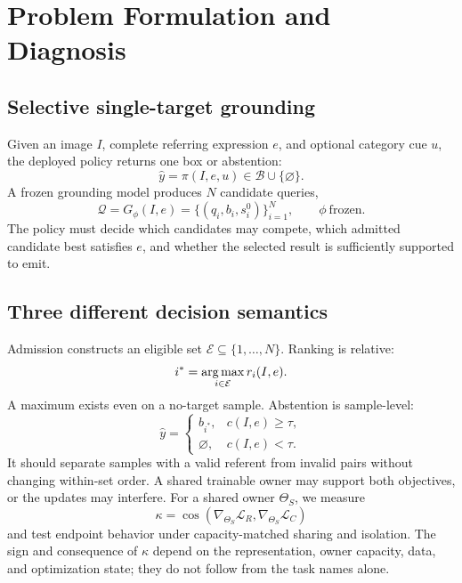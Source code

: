 \section{Problem Formulation and Diagnosis}
\label{sec:problem}

\subsection{Selective single-target grounding}
Given an image $I$, complete referring expression $e$, and optional category
cue $u$, the deployed policy returns one box or abstention:
\begin{equation}
  \hat y=\pi(I,e,u)\in\mathcal{B}\cup\{\varnothing\}.
\end{equation}
A frozen grounding model produces $N$ candidate queries,
\begin{equation}
  \mathcal{Q}=G_{\phi}(I,e)
  =\{(q_i,b_i,s_i^0)\}_{i=1}^{N},\qquad \phi\ \text{frozen}.
\end{equation}
The policy must decide which candidates may compete, which admitted candidate
best satisfies $e$, and whether the selected result is sufficiently supported
to emit.

\subsection{Three different decision semantics}
Admission constructs an eligible set $\mathcal{E}\subseteq\{1,\ldots,N\}$.
Ranking is relative:
\begin{equation}
  i^*=\operatorname*{arg\,max}_{i\in\mathcal{E}} r_i(I,e).
\end{equation}
A maximum exists even on a no-target sample.  Abstention is sample-level:
\begin{equation}
  \hat y =
  \begin{cases}
    b_{i^*}, & c(I,e)\geq\tau,\\
    \varnothing, & c(I,e)<\tau.
  \end{cases}
\end{equation}
It should separate samples with a valid referent from invalid pairs without
changing within-set order.  A shared trainable owner may support both
objectives, or the updates may interfere.  For a shared owner $\Theta_S$, we
measure
\begin{equation}
  \kappa =
  \cos\!\left(\nabla_{\Theta_S}\mathcal{L}_{R},
              \nabla_{\Theta_S}\mathcal{L}_{C}\right)
\end{equation}
and test endpoint behavior under capacity-matched sharing and isolation.  The
sign and consequence of $\kappa$ depend on the representation, owner capacity,
data, and optimization state; they do not follow from the task names alone.


